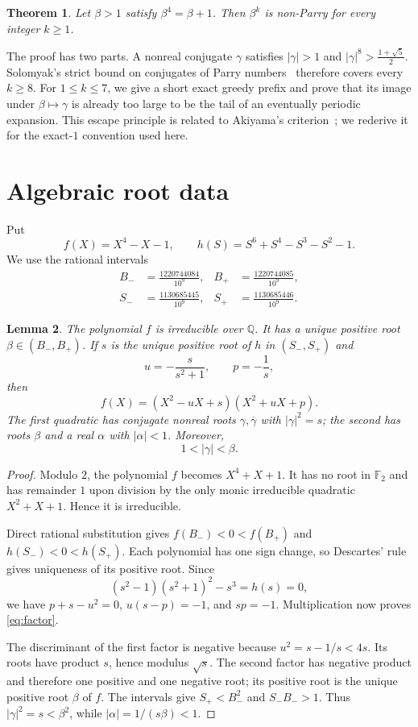 \documentclass[11pt]{amsart}
\newtheorem{theorem}{Theorem}[section]
\newtheorem{lemma}[theorem]{Lemma}
\theoremstyle{definition}
\newcommand{\Q}{\mathbb{Q}}
\newcommand{\phig}{\frac{1+\sqrt5}{2}}
\begin{document}
\begin{theorem}\label{thm:main}
Let $\beta>1$ satisfy $\beta^4=\beta+1$.  Then $\beta^k$ is non-Parry for
every integer $k\geq 1$.
\end{theorem}

The proof has two parts.  A nonreal conjugate $\gamma$ satisfies
$|\gamma|>1$ and $|\gamma|^8>\phig$.  Solomyak's strict bound on conjugates of
Parry numbers~\cite{Solomyak1994} therefore covers every $k\geq 8$.  For
$1\leq k\leq 7$, we give a short exact greedy prefix and prove that its image
under $\beta\mapsto\gamma$ is already too large to be the tail of an
eventually periodic expansion.  This escape principle is related to
Akiyama's criterion~\cite[Lemma~2.1]{Akiyama2016}; we rederive it for the
exact-$1$ convention used here.

\section{Algebraic root data}

Put
\[
f(X)=X^4-X-1,
\qquad
h(S)=S^6+S^4-S^3-S^2-1.
\]
We use the rational intervals
\begin{align}
B_-&=\frac{1220744084}{10^9}, &
B_+&=\frac{1220744085}{10^9},\label{eq:Binterval}\\
S_-&=\frac{1130685445}{10^9}, &
S_+&=\frac{1130685446}{10^9}.\label{eq:Sinterval}
\end{align}

\begin{lemma}\label{lem:roots}
The polynomial $f$ is irreducible over $\Q$.  It has a unique positive root
$\beta\in(B_-,B_+)$.  If $s$ is the unique positive root of $h$ in
$(S_-,S_+)$ and
\[
u=-\frac{s}{s^2+1},\qquad p=-\frac1s,
\]
then
\begin{equation}\label{eq:factor}
f(X)=(X^2-uX+s)(X^2+uX+p).
\end{equation}
The first quadratic has conjugate nonreal roots $\gamma,\overline\gamma$ with
$|\gamma|^2=s$; the second has roots $\beta$ and a real $\alpha$ with
$|\alpha|<1$.  Moreover,
\[
1<|\gamma|<\beta.
\]
\end{lemma}

\begin{proof}
Modulo $2$, the polynomial $f$ becomes $X^4+X+1$.  It has no root in
$\mathbb F_2$ and has remainder $1$ upon division by the only monic
irreducible quadratic $X^2+X+1$.  Hence it is irreducible.

Direct rational substitution gives
$f(B_-)<0<f(B_+)$ and $h(S_-)<0<h(S_+)$.  Each polynomial has one sign change,
so Descartes' rule gives uniqueness of its positive root.  Since
\[
(s^2-1)(s^2+1)^2-s^3=h(s)=0,
\]
we have $p+s-u^2=0$, $u(s-p)=-1$, and $sp=-1$.  Multiplication now proves
\eqref{eq:factor}.

The discriminant of the first factor is negative because
$u^2=s-1/s<4s$.  Its roots have product $s$, hence modulus $\sqrt{s}$.  The
second factor has negative product and therefore one positive and one negative
root; its positive root is the unique positive root $\beta$ of $f$.  The
intervals give $S_+<B_-^2$ and $S_-B_->1$.  Thus
$|\gamma|^2=s<\beta^2$, while
$|\alpha|=1/(s\beta)<1$.
\end{proof}
\end{document}
